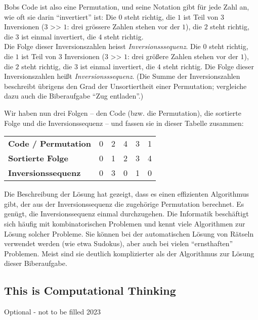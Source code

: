\documentclass[a4paper,11pt]{report}
\makeatletter
\renewenvironment{adjustwidth}[2]{%
    \begin{list}{}{%
    \partopsep\z@%
    \topsep\z@%
    \listparindent\parindent%
    \parsep\parskip%
    \@ifmtarg{#1}{\setlength{\leftmargin}{\z@}}%
                 {\setlength{\leftmargin}{#1}}%
    \@ifmtarg{#2}{\setlength{\rightmargin}{\z@}}%
                 {\setlength{\rightmargin}{#2}}%
    }
    \item[]}{\end{list}}
\makeatother
\begin{document}
Bobs Code ist also eine Permutation, und seine Notation gibt für jede Zahl an, wie oft sie darin \enquote{invertiert} ist:
Die $0$ steht richtig, die $1$ ist Teil von $3$ Inversionen ($3$ >\textcompwordmark{}> $1$: drei grössere Zahlen stehen vor der $1$),
die $2$ steht richtig, die $3$ ist einmal invertiert, die $4$ steht richtig. \\
Die Folge dieser Inversionszahlen heisst \emph{Inversionsssequenz}.
Die $0$ steht richtig, die $1$ ist Teil von $3$ Inversionen ($3$ >\textcompwordmark{}> $1$: drei größere Zahlen stehen vor der $1$),
die $2$ steht richtig, die $3$ ist einmal invertiert, die $4$ steht richtig.
Die Folge dieser Inversionszahlen heißt \emph{Inversionsssequenz}.
(Die Summe der Inversionszahlen beschreibt übrigens den Grad der Unsortiertheit einer Permutation; vergleiche dazu auch die Biberaufgabe \enquote{Zug entladen}.)

Wir haben nun drei Folgen – den Code (bzw. die Permutation), die sortierte Folge und die Inversionssequenz – und fassen sie in dieser Tabelle zusammen:

\begin{adjustwidth}{1.5em}{0em}
\begin{tabular}{ @{} l l l l l l @{} }
  \textbf{Code / Permutation} & 0 & 2 & 4 & 3 & 1 \\ 
  \textbf{Sortierte Folge} & 0 & 1 & 2 & 3 & 4 \\ 
  \textbf{Inversionssequenz} & 0 & 3 & 0 & 1 & 0
\end{tabular}


\end{adjustwidth}

Die Beschreibung der Lösung hat gezeigt, dass es einen effizienten Algorithmus gibt, der aus der Inversionssequenz die zugehörige Permutation berechnet. Es genügt, die Inversionssequenz einmal durchzugehen. Die Informatik beschäftigt sich häufig mit kombinatorischen Problemen und kennt viele Algorithmen zur Lösung solcher Probleme. Sie können bei der automatischen Lösung von Rätseln verwendet werden (wie etwa Sudokus), aber auch bei vielen \enquote{ernsthaften} Problemen. Meist sind sie deutlich komplizierter als der Algorithmus zur Lösung dieser Biberaufgabe.


\subsection*{This is Computational Thinking}

Optional - not to be filled 2023
\end{document}
